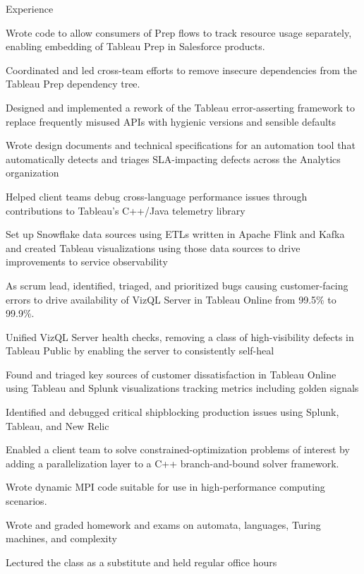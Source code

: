 \documentclass{cv}
\begin{document}

\begin{cvsection}{Experience}
  {
    \item Wrote code to allow consumers of Prep flows to track resource usage separately, enabling embedding of Tableau Prep in Salesforce products.
    \item Coordinated and led cross-team efforts to remove insecure dependencies from the Tableau Prep dependency tree.
    \item Designed and implemented a rework of the Tableau error-asserting framework to replace frequently misused APIs with hygienic versions and sensible defaults
    \item Wrote design documents and technical specifications for an automation tool that automatically detects and triages SLA-impacting defects across the Analytics organization
    \item Helped client teams debug cross-language performance issues through contributions to Tableau's C++/Java telemetry library
    \item Set up Snowflake data sources using ETLs written in Apache Flink and Kafka and created Tableau visualizations using those data sources to drive improvements to service observability
    \item As scrum lead, identified, triaged, and prioritized bugs causing customer-facing errors to drive availability of VizQL Server in Tableau Online from 99.5\% to 99.9\%.
    \item Unified VizQL Server health checks, removing a class of high-visibility defects in Tableau Public by enabling the server to consistently self-heal
    \item Found and triaged key sources of customer dissatisfaction in Tableau Online using Tableau and Splunk visualizations tracking metrics including golden signals
    \item Identified and debugged critical shipblocking production issues using Splunk, Tableau, and New Relic
  }
  {
    \item Enabled a client team to solve constrained-optimization problems of interest by adding a parallelization layer to a C++ branch-and-bound solver framework.
    \item Wrote dynamic MPI code suitable for use in high-performance computing scenarios.
  }
  {
    \item Wrote and graded homework and exams on automata, languages, Turing machines, and complexity
    \item Lectured the class as a substitute and held regular office hours
  }
\end{cvsection}
\end{document}
